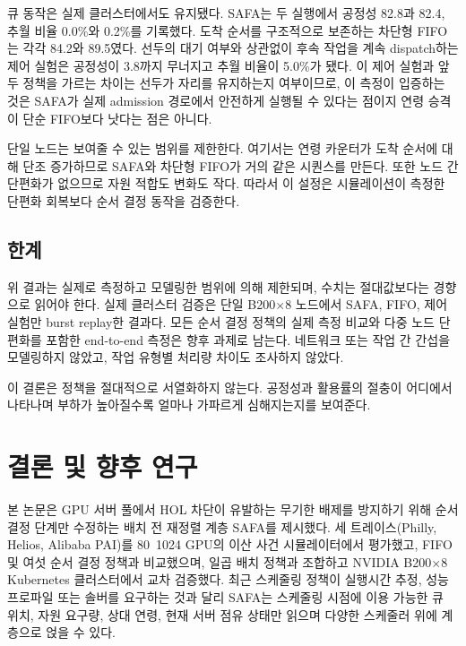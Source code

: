 \documentclass{ieeetj}
\begin{document}
큐 동작은 실제 클러스터에서도 유지됐다. SAFA는 두 실행에서 공정성 82.8과 82.4, 추월 비율 0.0\%와 0.2\%를 기록했다. 도착 순서를 구조적으로 보존하는 차단형 FIFO는 각각 84.2와 89.5였다. 선두의 대기 여부와 상관없이 후속 작업을 계속 dispatch하는 제어 실험은 공정성이 3.8까지 무너지고 추월 비율이 5.0\%가 됐다. 이 제어 실험과 앞 두 정책을 가르는 차이는 선두가 자리를 유지하는지 여부이므로, 이 측정이 입증하는 것은 SAFA가 실제 admission 경로에서 안전하게 실행될 수 있다는 점이지 연령 승격이 단순 FIFO보다 낫다는 점은 아니다.

단일 노드는 보여줄 수 있는 범위를 제한한다. 여기서는 연령 카운터가 도착 순서에 대해 단조 증가하므로 SAFA와 차단형 FIFO가 거의 같은 시퀀스를 만든다. 또한 노드 간 단편화가 없으므로 자원 적합도 변화도 작다. 따라서 이 설정은 시뮬레이션이 측정한 단편화 회복보다 순서 결정 동작을 검증한다.

\subsection{한계}\label{eval:threats}
위 결과는 실제로 측정하고 모델링한 범위에 의해 제한되며, 수치는 절대값보다는 경향으로 읽어야 한다. 실제 클러스터 검증은 단일 B200$\times$8 노드에서 SAFA, FIFO, 제어 실험만 burst replay한 결과다. 모든 순서 결정 정책의 실제 측정 비교와 다중 노드 단편화를 포함한 end-to-end 측정은 향후 과제로 남는다. 네트워크 또는 작업 간 간섭을 모델링하지 않았고, 작업 유형별 처리량 차이도 조사하지 않았다.

이 결론은 정책을 절대적으로 서열화하지 않는다. 공정성과 활용률의 절충이 어디에서 나타나며 부하가 높아질수록 얼마나 가파르게 심해지는지를 보여준다.

\FloatBarrier

\section{결론 및 향후 연구}\label{conclu}

본 논문은 GPU 서버 풀에서 HOL 차단이 유발하는 무기한 배제를 방지하기 위해 순서 결정 단계만 수정하는 배치 전 재정렬 계층 SAFA를 제시했다. 세 트레이스(Philly, Helios, Alibaba PAI)를 80~1024 GPU의 이산 사건 시뮬레이터에서 평가했고, FIFO 및 여섯 순서 결정 정책과 비교했으며, 일곱 배치 정책과 조합하고 NVIDIA B200$\times$8 Kubernetes 클러스터에서 교차 검증했다. 최근 스케줄링 정책이 실행시간 추정, 성능 프로파일 또는 솔버를 요구하는 것과 달리 SAFA는 스케줄링 시점에 이용 가능한 큐 위치, 자원 요구량, 상대 연령, 현재 서버 점유 상태만 읽으며 다양한 스케줄러 위에 계층으로 얹을 수 있다.
\end{document}
